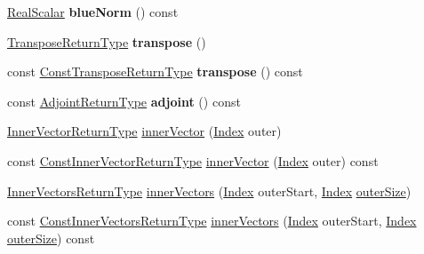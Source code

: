 \begin{DoxyCompactItemize}
\mbox{\label{class_eigen_1_1_sparse_matrix_base_a23769bd7c0784d25e69fb4759b18adf4}} 
\mbox{\hyperlink{class_eigen_1_1_sparse_matrix_base_aaec8ace6efb785c81d442931c3248d88}{Real\+Scalar}} {\bfseries blue\+Norm} () const
\item 
\mbox{\label{class_eigen_1_1_sparse_matrix_base_abef4b43a6c62c8eae9b5087d732b3a4a}} 
\mbox{\hyperlink{class_eigen_1_1_transpose}{Transpose\+Return\+Type}} {\bfseries transpose} ()
\item 
\mbox{\label{class_eigen_1_1_sparse_matrix_base_a2dba0403e15a7bc0552bb50e7c38b15d}} 
const \mbox{\hyperlink{class_eigen_1_1_transpose}{Const\+Transpose\+Return\+Type}} {\bfseries transpose} () const
\item 
\mbox{\label{class_eigen_1_1_sparse_matrix_base_adab34202f9694f1085b78850ea3dcb44}} 
const \mbox{\hyperlink{struct_eigen_1_1internal_1_1true__type}{Adjoint\+Return\+Type}} {\bfseries adjoint} () const
\item 
\mbox{\hyperlink{class_eigen_1_1_block}{Inner\+Vector\+Return\+Type}} \mbox{\hyperlink{class_eigen_1_1_sparse_matrix_base_a65aaf3b50d205011e2bfa0de24756cce}{inner\+Vector}} (\mbox{\hyperlink{struct_eigen_1_1_eigen_base_a554f30542cc2316add4b1ea0a492ff02}{Index}} outer)
\item 
const \mbox{\hyperlink{class_eigen_1_1_block}{Const\+Inner\+Vector\+Return\+Type}} \mbox{\hyperlink{class_eigen_1_1_sparse_matrix_base_a1050a842569fcdadf8d936250301e72d}{inner\+Vector}} (\mbox{\hyperlink{struct_eigen_1_1_eigen_base_a554f30542cc2316add4b1ea0a492ff02}{Index}} outer) const
\item 
\mbox{\hyperlink{class_eigen_1_1_block}{Inner\+Vectors\+Return\+Type}} \mbox{\hyperlink{class_eigen_1_1_sparse_matrix_base_a3c51bf5a7eb18eab9a85949d03aed14a}{inner\+Vectors}} (\mbox{\hyperlink{struct_eigen_1_1_eigen_base_a554f30542cc2316add4b1ea0a492ff02}{Index}} outer\+Start, \mbox{\hyperlink{struct_eigen_1_1_eigen_base_a554f30542cc2316add4b1ea0a492ff02}{Index}} \mbox{\hyperlink{class_eigen_1_1_sparse_matrix_base_ac86cc88a4cfef21db6b64ec0ab4c8f0a}{outer\+Size}})
\item 
const \mbox{\hyperlink{class_eigen_1_1_block}{Const\+Inner\+Vectors\+Return\+Type}} \mbox{\hyperlink{class_eigen_1_1_sparse_matrix_base_ae6585c991d04c139f2486ab81f56ad1a}{inner\+Vectors}} (\mbox{\hyperlink{struct_eigen_1_1_eigen_base_a554f30542cc2316add4b1ea0a492ff02}{Index}} outer\+Start, \mbox{\hyperlink{struct_eigen_1_1_eigen_base_a554f30542cc2316add4b1ea0a492ff02}{Index}} \mbox{\hyperlink{class_eigen_1_1_sparse_matrix_base_ac86cc88a4cfef21db6b64ec0ab4c8f0a}{outer\+Size}}) const

\end{DoxyCompactItemize}
